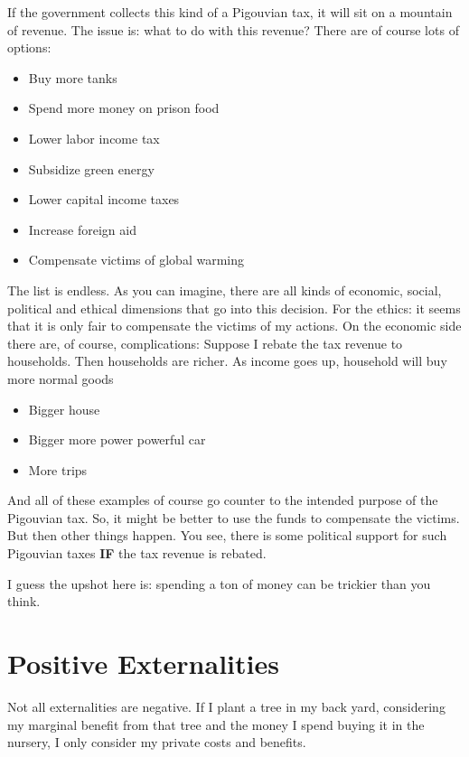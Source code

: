 \documentclass[
]{book}
\providecommand{\tightlist}{%
  \setlength{\itemsep}{0pt}\setlength{\parskip}{0pt}}
\begin{document}
If the government collects this kind of a Pigouvian tax, it will sit on a mountain of revenue. The issue is: what to do with this revenue? There are of course lots of options:

\begin{itemize}
\tightlist
\item
  Buy more tanks
\item
  Spend more money on prison food
\item
  Lower labor income tax
\item
  Subsidize green energy
\item
  Lower capital income taxes
\item
  Increase foreign aid
\item
  Compensate victims of global warming
\end{itemize}

The list is endless. As you can imagine, there are all kinds of economic, social, political and ethical dimensions that go into this decision. For the ethics: it seems that it is only fair to compensate the victims of my actions. On the economic side there are, of course, complications: Suppose I rebate the tax revenue to households. Then households are richer. As income goes up, household will buy more normal goods

\begin{itemize}
\tightlist
\item
  Bigger house
\item
  Bigger more power powerful car
\item
  More trips
\end{itemize}

And all of these examples of course go counter to the intended purpose of the Pigouvian tax. So, it might be better to use the funds to compensate the victims. But then other things happen. You see, there is some political support for such Pigouvian taxes \textbf{IF} the tax revenue is rebated.

I guess the upshot here is: spending a ton of money can be trickier than you think.

\hypertarget{positive-externalities}{%
\section{Positive Externalities}\label{positive-externalities}}

Not all externalities are negative. If I plant a tree in my back yard, considering my marginal benefit from that tree and the money I spend buying it in the nursery, I only consider my private costs and benefits.
\end{document}
